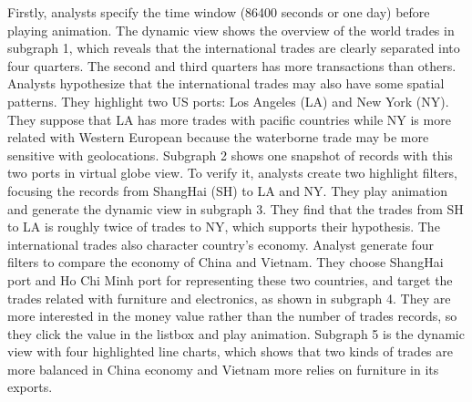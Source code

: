 \documentclass[journal]{vgtc}                %
\begin{document}
{Firstly, analysts specify the time window (86400 seconds or one day) before playing animation. The dynamic view shows the overview of the world trades in subgraph 1, which reveals that the international trades are clearly separated into four quarters. The second and third quarters has more transactions than others. Analysts hypothesize that the international trades may also have some spatial patterns. They highlight two US ports: Los Angeles (LA) and New York (NY). They suppose that LA has more trades with pacific countries while NY is more related with Western European because the waterborne trade may be more sensitive with geolocations. Subgraph 2 shows one snapshot of records with this two ports in virtual globe view. To verify it, analysts create two highlight filters, focusing the records from ShangHai (SH) to LA and NY. They play animation and generate the dynamic view in subgraph 3. They find that the trades from SH to LA is roughly twice of trades to NY, which supports  their hypothesis. The international trades also character country's economy. Analyst generate four filters to compare the economy of China and Vietnam. They choose ShangHai port and Ho Chi Minh port for representing these two countries, and target the trades related with furniture and electronics, as shown in subgraph 4. They are more interested in the money value rather than the number of trades records, so they click the value in the listbox and play animation. Subgraph 5 is the dynamic view with four highlighted line charts, which shows that two kinds of trades are more balanced in China economy and Vietnam more relies on furniture in its exports. 

   




}
\end{document}
